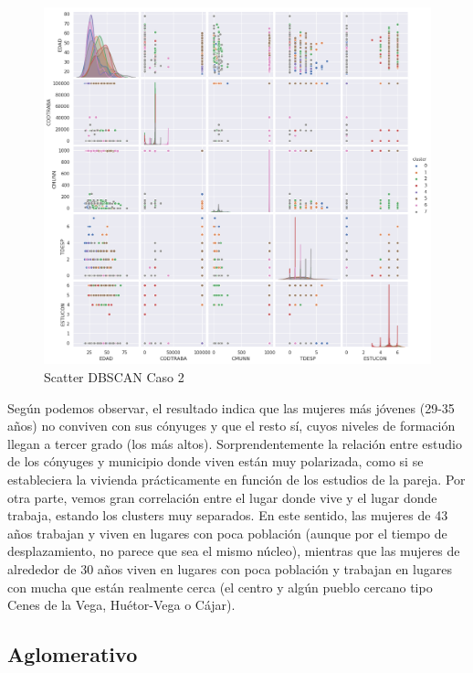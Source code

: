 \begin{figure}[H] %
	\centering
	\includegraphics[scale=0.4]{dbscan2.png}  %
	\caption{Scatter DBSCAN Caso 2} 
	\label{fig:sc-db-caso2}
\end{figure}

Según podemos observar, el resultado indica que las mujeres más jóvenes (29-35 años) no conviven con sus cónyuges y que el resto sí, cuyos niveles de formación llegan a tercer grado (los más altos). Sorprendentemente la relación entre estudio de los cónyuges y municipio donde viven están muy polarizada, como si se estableciera la vivienda prácticamente en función de los estudios de la pareja. Por otra parte, vemos gran correlación entre el lugar donde vive y el lugar donde trabaja, estando los clusters muy separados. En este sentido, las mujeres de 43 años trabajan y viven en lugares con poca población (aunque por el tiempo de desplazamiento, no parece que sea el mismo núcleo), mientras que las mujeres de alrededor de 30 años viven en lugares con poca población y trabajan en lugares con mucha que están realmente cerca (el centro y algún pueblo cercano tipo Cenes de la Vega, Huétor-Vega o Cájar).

\subsection{Aglomerativo}


